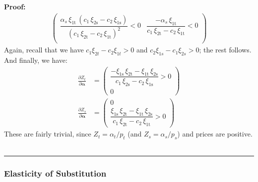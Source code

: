 \documentclass[11pt,a4paper,leqno]{extarticle}
\newenvironment{proof}[1][Proof]{\noindent\textbf{#1:} }{\ \rule{0.5em}{0.5em}}
\begin{document}
\begin{proof}
\begin{align*}
\begin{pmatrix}
		\dfrac{\alpha _{s}\,\xi _{\mathrm{1t}}\,\left(c_{1}\,\xi _{\mathrm{2s}}-c_{2}\,\xi _{\mathrm{1s}}\right)}{{\left(c_{1}\,\xi _{\mathrm{2t}}-c_{2}\,\xi _{\mathrm{1t}}\right)}^2} < 0& \dfrac{-\alpha _{s}\,\xi _{\mathrm{1t}}}{c_{1}\,\xi _{\mathrm{2t}}-c_{2}\,\xi _{\mathrm{1t}}} <0\\
		\end{pmatrix}
		\end{align*}
		Again, recall that we have $c_1 \xi_{2t} - c_2 \xi_{1t} > 0$ and $c_2 \xi_{1s} - c_1 \xi_{2s} > 0$; the rest follows. And finally, we have:
		\begin{align*}
		\frac{\partial Z_t}{\partial \boldsymbol{\alpha}} &= 
		\begin{pmatrix}
		\dfrac{-\xi _{\mathrm{1s}}\,\xi _{\mathrm{2t}}-\xi _{\mathrm{1t}}\,\xi _{\mathrm{2s}}}{c_{1}\,\xi _{\mathrm{2s}}-c_{2}\,\xi _{\mathrm{1s}}} > 0  \\
		0
		\end{pmatrix} \\
		\frac{\partial Z_s}{\partial \boldsymbol{\alpha}} &= 
		\begin{pmatrix}
		0 \\
		\dfrac{\xi _{\mathrm{1s}}\,\xi _{\mathrm{2t}}-\xi _{\mathrm{1t}}\,\xi _{\mathrm{2s}}}{c_{1}\,\xi _{\mathrm{2t}}-c_{2}\,\xi _{\mathrm{1t}}} > 0
		\end{pmatrix}
		\end{align*}
		These are fairly trivial, since $Z_t = \alpha_t / p_t$ (and $Z_s = \alpha_s/ p_s$) and prices are positive. \\
		\hfill
	\end{proof}
	
	
	\subsubsection{Elasticity of Substitution}
	\label{sec:EOS_derivation}
	
\end{document}
